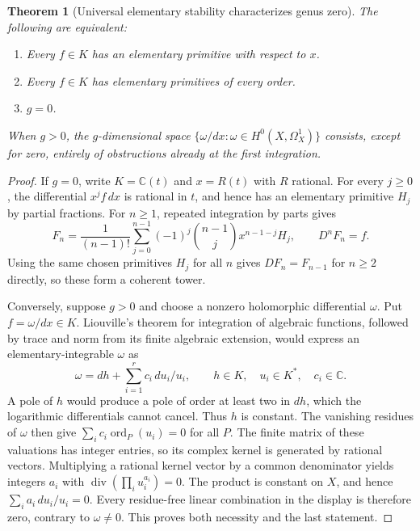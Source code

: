 \documentclass[11pt,a4paper]{article}
\newtheorem{theorem}{Theorem}[section]
\theoremstyle{definition}
\theoremstyle{remark}
\numberwithin{equation}{section}
\begin{document}
\begin{theorem}[Universal elementary stability characterizes genus zero]
\label{geom:elementary}
The following are equivalent:
\begin{enumerate}
\item Every $f\in K$ has an elementary primitive with respect to $x$.
\item Every $f\in K$ has elementary primitives of every order.
\item $g=0$.
\end{enumerate}
When $g>0$, the $g$-dimensional space
$\{\omega/dx:\omega\in H^0(X,\Omega_X^1)\}$ consists, except for zero,
entirely of obstructions already at the first integration.
\end{theorem}
\begin{proof}
If $g=0$, write $K=\mathbb C(t)$ and $x=R(t)$ with $R$ rational.
For every $j\ge0$, the differential $x^j f\,dx$ is rational in $t$,
and hence has an elementary primitive $H_j$ by partial fractions.
For $n\ge1$, repeated integration by parts gives
\[
 F_n=\frac1{(n-1)!}\sum_{j=0}^{n-1}(-1)^j\binom{n-1}{j}
                 x^{n-1-j}H_j,
 \qquad D^nF_n=f.
\]
Using the same chosen primitives $H_j$ for all $n$ gives
$DF_n=F_{n-1}$ for $n\ge2$ directly, so these form a coherent tower.

Conversely, suppose $g>0$ and choose a nonzero holomorphic differential
$\omega$. Put $f=\omega/dx\in K$. Liouville's theorem for integration
of algebraic functions, followed by trace and norm from its finite
algebraic extension, would express an elementary-integrable $\omega$ as
\[
 \omega=dh+\sum_{i=1}^r c_i\,du_i/u_i,
 \qquad h\in K,\quad u_i\in K^*,\quad c_i\in\mathbb C.
\]
A pole of $h$ would produce a pole of order at least two in $dh$,
which the logarithmic differentials cannot cancel. Thus $h$ is constant.
The vanishing residues of $\omega$ then give
$\sum_i c_i\operatorname{ord}_P(u_i)=0$ for all $P$.
The finite matrix of these valuations has integer entries, so its
complex kernel is generated by rational vectors. Multiplying a
rational kernel vector by a common denominator yields integers $a_i$
with $\operatorname{div}(\prod_i u_i^{a_i})=0$. The product is constant
on $X$, and hence $\sum_i a_i\,du_i/u_i=0$. Every residue-free
linear combination in the display is therefore zero, contrary to
$\omega\ne0$. This proves both necessity and the last statement.
\end{proof}
\end{document}
